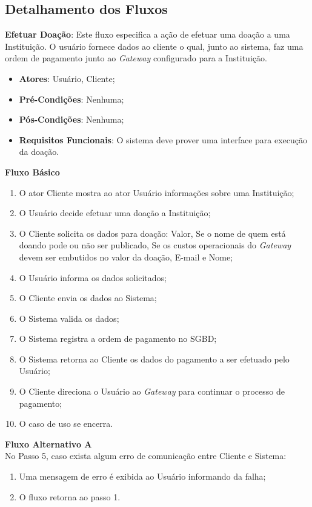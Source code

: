 \begin{anexosenv}
\subsection*{Detalhamento dos Fluxos}
\begin{lista}
  \item \textbf{Efetuar Doação}: Este fluxo especifica a ação de efetuar uma doação a uma Instituição. O usuário fornece dados ao cliente o qual, junto ao sistema, faz uma ordem de pagamento junto ao \emph{Gateway} configurado para a Instituição.
    \begin{itemize}
    \item \textbf{Atores}: Usuário, Cliente;
    \item \textbf{Pré-Condições}: Nenhuma;
    \item \textbf{Pós-Condições}: Nenhuma;
    \item \textbf{Requisitos Funcionais}: O sistema deve prover uma interface para execução da doação.
    \end{itemize}
	
    \textbf{Fluxo Básico}
    \begin{enumerate}
    \item O ator Cliente mostra ao ator Usuário informações sobre uma Instituição;
    \item O Usuário decide efetuar uma doação a Instituição;
    \item O Cliente solicita os dados para doação: Valor, Se o nome de quem está doando pode ou não ser publicado, Se os custos operacionais do \emph{Gateway} devem ser embutidos no valor da doação, E-mail e Nome;
    \item O Usuário informa os dados solicitados;
    \item O Cliente envia os dados ao Sistema;
    \item O Sistema valida os dados;
    \item O Sistema registra a ordem de pagamento no SGBD;
    \item O Sistema retorna ao Cliente os dados do pagamento a ser efetuado pelo Usuário;
    \item O Cliente direciona o Usuário ao \emph{Gateway} para continuar o processo de pagamento;
    \item O caso de uso se encerra.
    \end{enumerate}
    
    \textbf{Fluxo Alternativo A} \\
    No Passo 5, caso exista algum erro de comunicação entre Cliente e Sistema:
    \begin{enumerate}
    \item Uma mensagem de erro é exibida ao Usuário informando da falha;
    \item O fluxo retorna ao passo 1.
    \end{enumerate}
    

\end{lista}
\end{anexosenv}
